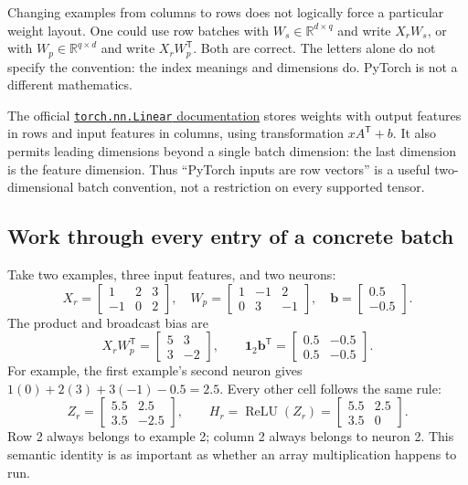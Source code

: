 \begin{warning}
Changing examples from columns to rows does not logically force a particular weight layout. One could use row batches with $W_s\in\mathbb{R}^{d\times q}$ and write $X_rW_s$, or with $W_p\in\mathbb{R}^{q\times d}$ and write $X_rW_p^{\mathsf T}$. Both are correct. The letters alone do not specify the convention: the index meanings and dimensions do. PyTorch is not a different mathematics.
\end{warning}
The official \href{https://docs.pytorch.org/docs/stable/generated/torch.nn.Linear.html}{\texttt{torch.nn.Linear} documentation} stores weights with output features in rows and input features in columns, using transformation $xA^{\mathsf T}+b$. It also permits leading dimensions beyond a single batch dimension: the last dimension is the feature dimension. Thus ``PyTorch inputs are row vectors'' is a useful two-dimensional batch convention, not a restriction on every supported tensor.

\subsection{Work through every entry of a concrete batch}
Take two examples, three input features, and two neurons:
\[
 X_r=\begin{bmatrix}1&2&3\\-1&0&2\end{bmatrix},\quad
 W_p=\begin{bmatrix}1&-1&2\\0&3&-1\end{bmatrix},\quad
 \mathbf{b}=\begin{bmatrix}0.5\\-0.5\end{bmatrix}.
\]
The product and broadcast bias are
\[
 X_rW_p^{\mathsf T}=\begin{bmatrix}5&3\\3&-2\end{bmatrix},\qquad
 \mathbf1_2\mathbf{b}^{\mathsf T}=\begin{bmatrix}0.5&-0.5\\0.5&-0.5\end{bmatrix}.
\]
For example, the first example's second neuron gives
$1(0)+2(3)+3(-1)-0.5=2.5$. Every other cell follows the same rule:
\[
 Z_r=\begin{bmatrix}5.5&2.5\\3.5&-2.5\end{bmatrix},\qquad
 H_r=\operatorname{ReLU}(Z_r)=\begin{bmatrix}5.5&2.5\\3.5&0\end{bmatrix}.
\]
Row 2 always belongs to example 2; column 2 always belongs to neuron 2. This semantic identity is as important as whether an array multiplication happens to run.

